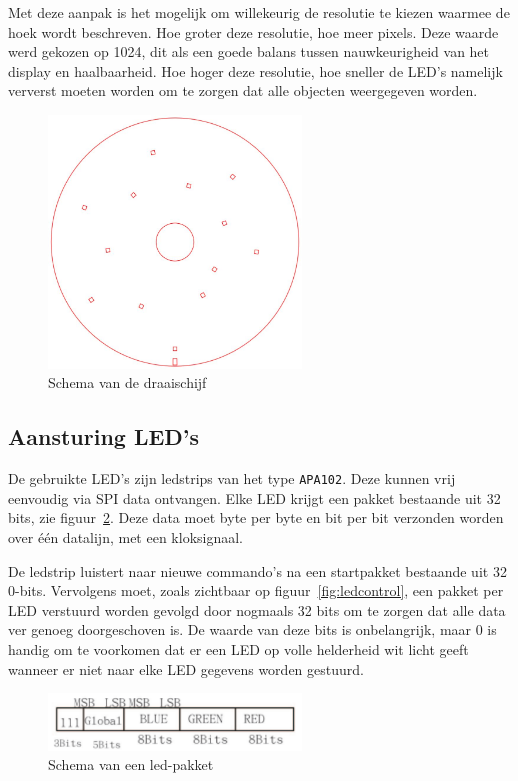 \documentclass[12pt]{ugentreport}
\begin{document}
Met deze aanpak is het mogelijk om willekeurig de resolutie te kiezen
waarmee de hoek wordt beschreven. Hoe groter deze resolutie,
hoe meer pixels. Deze waarde werd gekozen op 1024, dit als een goede balans
tussen nauwkeurigheid van het display en haalbaarheid. Hoe hoger deze resolutie,
hoe sneller de LED's namelijk ververst moeten worden om te zorgen dat alle
objecten weergegeven worden.

\begin{figure}
  \centering
  \includegraphics[width=0.6\textwidth]{img/schijf.jpg}
  \caption{Schema van de draaischijf}
  \label{fig:schijf}
\end{figure}

\subsection{Aansturing LED's}
De gebruikte LED's zijn ledstrips van het type \texttt{APA102}.
Deze kunnen vrij eenvoudig via SPI data ontvangen.
Elke LED krijgt een pakket bestaande uit 32 bits, zie
figuur~\ref{fig:ledpakket}.
Deze data moet byte per byte en bit per bit verzonden worden over één datalijn,
met een kloksignaal.

De ledstrip luistert naar nieuwe commando's na een startpakket
bestaande uit 32 0-bits. Vervolgens moet,
zoals zichtbaar op figuur~\ref{fig:ledcontrol},
een pakket per LED verstuurd worden gevolgd door
nogmaals 32 bits om te zorgen dat alle data ver genoeg doorgeschoven is.
De waarde van deze bits is onbelangrijk,
maar 0 is handig om te voorkomen dat er een LED op volle helderheid wit licht
geeft wanneer er niet naar elke LED gegevens worden gestuurd.

\begin{figure}
  \centering
  \includegraphics[width=0.6\textwidth]{img/ledpakket.png}
  \caption{Schema van een led-pakket}
  \label{fig:ledpakket}
\end{figure}
\end{document}
